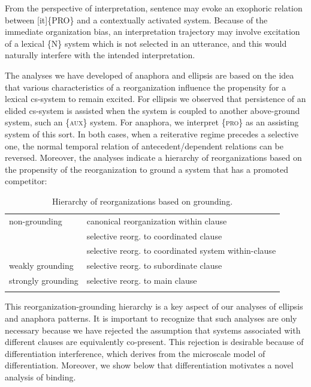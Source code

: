   From the perspective of interpretation, sentence  may evoke an exophoric relation between [it]\{PRO\} and a contextually activated system. Because of the immediate organization bias, an interpretation trajectory may involve excitation of a lexical \{N\} system which is not selected in an utterance, and this would naturally interfere with the intended interpretation. 

  The analyses we have developed of anaphora and ellipsis are based on the idea that various characteristics of a reorganization influence the propensity for a lexical cs-system to remain excited. For ellipsis we observed that persistence of an elided cs-system is assisted when the system is coupled to another above-ground system, such an \{\textsc{aux}\} system. For anaphora, we interpret \{\textsc{pro}\} as an assisting system of this sort. In both cases, when a reiterative regime precedes a selective one, the normal temporal relation of antecedent/dependent relations can be reversed. Moreover, the analyses indicate a hierarchy of reorganizations based on the propensity of the reorganization to ground a system that has a promoted competitor:

\begin{table}
\begin{tabularx}{\textwidth}{Xl}
\lsptoprule
non-grounding & canonical reorganization within clause\\
& selective reorg. to coordinated clause\\
& selective reorg. to coordinated system within-clause\\
\hline
weakly grounding & selective reorg. to subordinate clause\\
\hline
strongly grounding & selective reorg. to main clause\\
\lspbottomrule
\end{tabularx}
\caption{Hierarchy of reorganizations based on grounding.}\label{tab:7:3}
\end{table}

  This reorganization-grounding hierarchy is a key aspect of our analyses of ellipsis and anaphora patterns. It is important to recognize that such analyses are only necessary because we have rejected the assumption that systems associated with different clauses are equivalently co-present. This rejection is desirable because of differentiation interference, which derives from the microscale model of differentiation. Moreover, we show below that differentiation motivates a novel analysis of binding.

